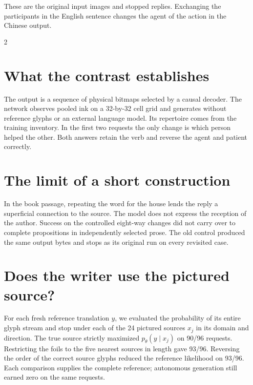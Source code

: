 \newpage
{}
\noindent These are the original input images and stopped replies. Exchanging the participants in the English sentence changes the agent of the action in the Chinese output.
\begin{multicols}{2}
\section*{What the contrast establishes}
The output is a sequence of physical bitmaps selected by a causal decoder. The network observes pooled ink on a 32-by-32 cell grid and generates without reference glyphs or an external language model. Its repertoire comes from the training inventory. In the first two requests the only change is which person helped the other. Both answers retain the verb and reverse the agent and patient correctly.
\section*{The limit of a short construction}
In the book passage, repeating the word for the house lends the reply a superficial connection to the source. The model does not express the reception of the author. Success on the controlled eight-way changes did not carry over to complete propositions in independently selected prose. The old control produced the same output bytes and stops as its original run on every revisited case.
\section*{Does the writer use the pictured source?}
For each fresh reference translation $y$, we evaluated the probability of its entire glyph stream and stop under each of the 24 pictured sources $x_j$ in its domain and direction. The true source strictly maximized $p_\theta(y\mid x_j)$ on 90/96 requests. Restricting the foils to the five nearest sources in length gave 93/96. Reversing the order of the correct source glyphs reduced the reference likelihood on 93/96. Each comparison supplies the complete reference; autonomous generation still earned zero on the same requests.
\par{}
\end{multicols}
